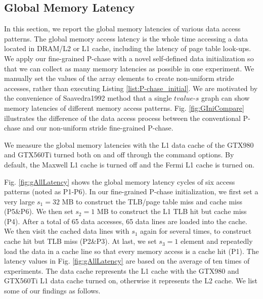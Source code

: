 \documentclass[10pt,journal,compsoc]{IEEEtran}
\theoremstyle{definition}
\begin{document}
\subsection{Global Memory Latency}

In this section, we report the global memory latencies of various data access patterns. The global memory access latency is the whole time accessing a data located in DRAM/L2 or L1 cache, including the latency of page table look-ups. We apply our fine-grained P-chase with a novel self-defined data initialization so that we can collect as many memory latencies as possible in one experiment. We manually set the values of the array elements to create non-uniform stride accesses, rather than executing Listing \ref{list:P-chase_initial}. We are motivated by the convenience of Saavedra1992 method that a single $tvalue$-$s$ graph can show memory latencies of different memory access patterns. Fig. \ref{fig:GIniCompare} illustrates the difference of the data access process between the conventional P-chase and our non-uniform stride fine-grained P-chase.

We measure the global memory latencies with the L1 data cache of the GTX980 and GTX560Ti turned both on and off through the command options. By default, the Maxwell L1 cache is turned off and the Fermi L1 cache is turned on.

Fig. \ref{fig:gAllLatency} shows the global memory latency cycles of six access patterns (noted as P1-P6). In our fine-grained P-chase initialization, we first set a very large $s_1=32$ MB to construct the TLB/page table miss and cache miss (P5\&P6). We then set $s_2=1$ MB to construct the L1 TLB hit but cache miss (P4). After a total of 65 data accesses, 65 data lines are loaded into the cache. We then visit the cached data lines with $s_1$ again for several times, to construct cache hit but TLB miss (P2\&P3). At last, we set $s_3=1$ element and repeatedly load the data in a cache line so that every memory access is a cache hit (P1). The latency values in Fig. \ref{fig:gAllLatency} are based on the average of ten times of experiments. The data cache represents the L1 cache with the GTX980 and GTX560Ti L1 data cache turned on, otherwise it represents the L2 cache. We list some of our findings as follows.
\end{document}
